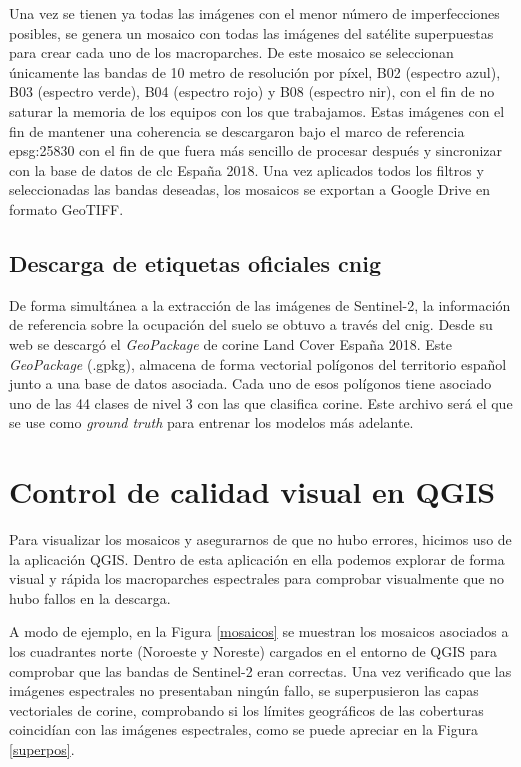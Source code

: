 Una vez se tienen ya todas las imágenes con el menor número de imperfecciones posibles, se genera un mosaico con todas las imágenes del satélite
superpuestas para crear cada uno de los macroparches. De este mosaico se seleccionan únicamente las bandas de 10 metro de resolución por píxel, 
B02 (espectro azul), B03 (espectro verde), B04 (espectro rojo) y B08 (espectro \acrshort{nir}), con el fin de no saturar la memoria de los 
equipos con los que trabajamos. Estas imágenes con el fin de mantener una coherencia se descargaron bajo el marco de referencia \acrshort{epsg}:25830
con el fin de que fuera más sencillo de procesar después y sincronizar con la base de datos de \acrshort{clc} España 2018. Una vez aplicados
todos los filtros y seleccionadas las bandas deseadas, los mosaicos se exportan a Google Drive en formato GeoTIFF.


\subsection{Descarga de etiquetas oficiales \acrshort{cnig}}

De forma simultánea a la extracción de las imágenes de Sentinel-2, la información de referencia sobre la ocupación del suelo se obtuvo a través del
\acrfull{cnig}. Desde su web se descargó el \textit{GeoPackage} de \acrshort{corine} Land Cover España 2018. Este \textit{GeoPackage} (.gpkg), almacena
de forma vectorial polígonos del territorio español junto a una base de datos asociada. Cada uno de esos polígonos tiene asociado uno de las 44 
clases de nivel 3 con las que clasifica \acrshort{corine}. Este archivo será el que se use como \textit{ground truth} para entrenar los modelos más adelante. 


\section{Control de calidad visual en QGIS}

Para visualizar los mosaicos y asegurarnos de que no hubo errores, hicimos uso de la aplicación QGIS. Dentro de esta aplicación en ella podemos 
explorar de forma visual y rápida los macroparches espectrales para comprobar visualmente que no hubo fallos en la descarga.


A modo de ejemplo, en la Figura \autoref{mosaicos} se muestran los mosaicos asociados a los cuadrantes norte (Noroeste y Noreste) cargados en el entorno de QGIS
para comprobar que las bandas de Sentinel-2 eran correctas. Una vez verificado que las imágenes espectrales no presentaban ningún fallo, se superpusieron
las capas vectoriales de \acrshort{corine}, comprobando si los límites geográficos de las coberturas coincidían con las imágenes espectrales, como 
se puede apreciar en la Figura \autoref{superpos}.

